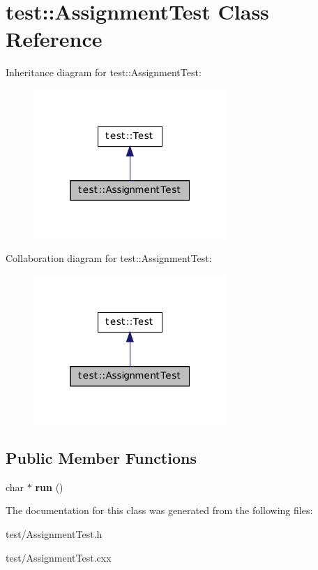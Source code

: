 \hypertarget{classtest_1_1_assignment_test}{
\section{test::AssignmentTest Class Reference}
\label{classtest_1_1_assignment_test}
}


Inheritance diagram for test::AssignmentTest:\nopagebreak
\begin{figure}[H]
\begin{center}
\leavevmode
\includegraphics[width=208pt]{classtest_1_1_assignment_test__inherit__graph}
\end{center}
\end{figure}


Collaboration diagram for test::AssignmentTest:\nopagebreak
\begin{figure}[H]
\begin{center}
\leavevmode
\includegraphics[width=208pt]{classtest_1_1_assignment_test__coll__graph}
\end{center}
\end{figure}
\subsection*{Public Member Functions}
\begin{DoxyCompactItemize}
\item 
\hypertarget{classtest_1_1_assignment_test_aa6d17a10c5a139e78587929bc42b5a75}{
char $\ast$ {\bfseries run} ()}
\label{classtest_1_1_assignment_test_aa6d17a10c5a139e78587929bc42b5a75}

\end{DoxyCompactItemize}


The documentation for this class was generated from the following files:\begin{DoxyCompactItemize}
\item 
test/AssignmentTest.h\item 
test/AssignmentTest.cxx\end{DoxyCompactItemize}
